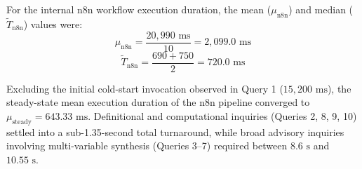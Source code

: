 For the internal n8n workflow execution duration, the mean ($\mu_{\text{n8n}}$) and median ($\tilde{T}_{\text{n8n}}$) values were:
\begin{equation}
\mu_{\text{n8n}} = \frac{20,990\text{ ms}}{10} = 2,099.0\text{ ms}
\end{equation}
\begin{equation}
\tilde{T}_{\text{n8n}} = \frac{690 + 750}{2} = 720.0\text{ ms}
\end{equation}

Excluding the initial cold-start invocation observed in Query 1 ($15,200\text{ ms}$), the steady-state mean execution duration of the n8n pipeline converged to $\mu_{\text{steady}} = 643.33\text{ ms}$. Definitional and computational inquiries (Queries 2, 8, 9, 10) settled into a sub-1.35-second total turnaround, while broad advisory inquiries involving multi-variable synthesis (Queries 3--7) required between $8.6\text{ s}$ and $10.55\text{ s}$.
